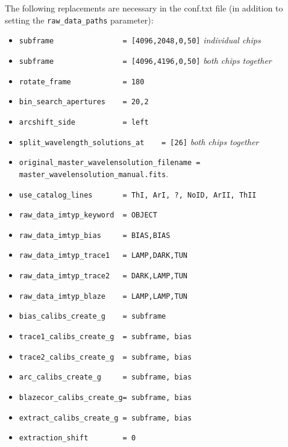 \documentclass[10pt,a4paper]{article}
\begin{document}
\noindent The following replacements are necessary in the conf.txt file (in addition to setting the \verb|raw_data_paths| parameter):
\begin{itemize}\small\setlength\itemsep{-0.1cm}
  \small
  \item \verb|subframe                = [4096,2048,0,50]| \textit{individual chips}
  \item \verb|subframe                = [4096,4196,0,50]| \textit{both chips together}
  \item \verb|rotate_frame            = 180|
  \item \verb|bin_search_apertures    = 20,2|
  \item \verb|arcshift_side           = left|
  \item \verb|split_wavelength_solutions_at    = [26]| 	\textit{both chips together}
  \item \verb|original_master_wavelensolution_filename = master_wavelensolution_manual.fits|.
  \item \verb|use_catalog_lines 	  = ThI, ArI, ?, NoID, ArII, ThII|
  \item \verb|raw_data_imtyp_keyword  = OBJECT|
  \item \verb|raw_data_imtyp_bias     = BIAS,BIAS|
  \item \verb|raw_data_imtyp_trace1   = LAMP,DARK,TUN|
  \item \verb|raw_data_imtyp_trace2   = DARK,LAMP,TUN|
  \item \verb|raw_data_imtyp_blaze    = LAMP,LAMP,TUN|
  \item \verb|bias_calibs_create_g    = subframe|
  \item \verb|trace1_calibs_create_g  = subframe, bias|
  \item \verb|trace2_calibs_create_g  = subframe, bias|
  \item \verb|arc_calibs_create_g     = subframe, bias|
  \item \verb|blazecor_calibs_create_g= subframe, bias|
  \item \verb|extract_calibs_create_g = subframe, bias|
  \item \verb|extraction_shift        = 0|
\end{itemize}
\end{document}
